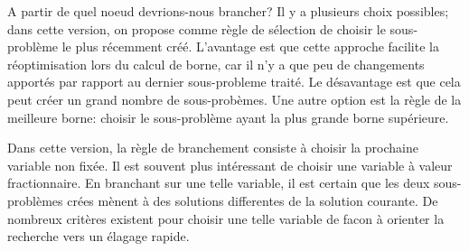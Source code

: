 A partir de quel noeud devrions-nous brancher? Il y a plusieurs choix possibles; dans cette version, on propose comme règle de sélection de choisir le sous-problème le plus récemment créé.
L'avantage est que cette approche facilite la réoptimisation lors du calcul de borne, car il n'y a que peu de changements apportés par rapport au dernier sous-probleme traité.
Le désavantage est que cela peut créer un grand nombre de sous-probèmes.
Une autre option est la règle de la meilleure borne: choisir le sous-problème ayant la plus grande borne supérieure.

Dans cette version, la règle de branchement consiste à choisir la prochaine variable non fixée. Il est souvent plus intéressant de choisir une variable à valeur fractionnaire.
En branchant sur une telle variable, il est certain que les deux sous-problèmes crées mènent à des solutions differentes de la solution courante.
De nombreux critères existent pour choisir une telle variable de facon à orienter la recherche vers un élagage rapide.

